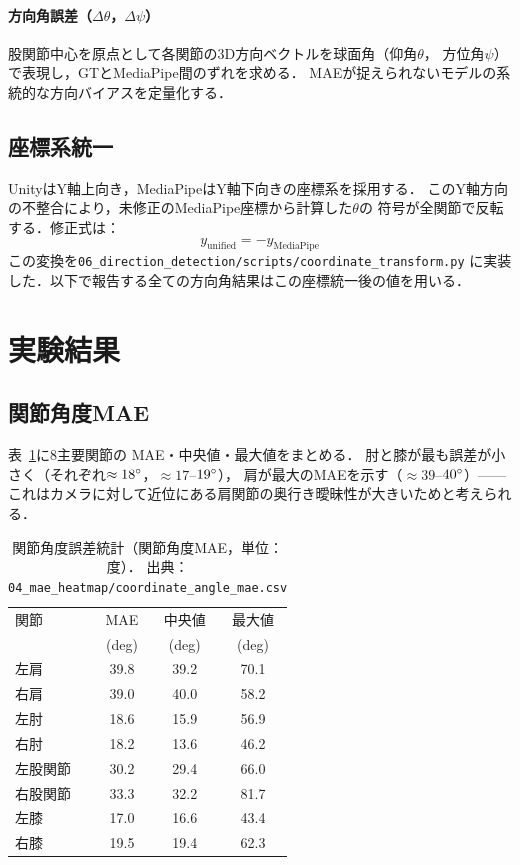 \documentclass[twocolumn]{article}
\begin{document}
\paragraph{方向角誤差（$\Delta\theta$，$\Delta\psi$）}
股関節中心を原点として各関節の3D方向ベクトルを球面角（仰角$\theta$，
方位角$\psi$）で表現し，GTとMediaPipe間のずれを求める．
MAEが捉えられないモデルの系統的な方向バイアスを定量化する．

\subsection{座標系統一}

UnityはY軸上向き，MediaPipeはY軸下向きの座標系を採用する．
このY軸方向の不整合により，未修正のMediaPipe座標から計算した$\theta$の
符号が全関節で反転する．修正式は：
\[
  y_{\text{unified}} = -y_{\text{MediaPipe}}
\]
この変換を\texttt{06\_direction\_detection/scripts/coordinate\_transform.py}
に実装した．以下で報告する全ての方向角結果はこの座標統一後の値を用いる．

\section{実験結果}

\subsection{関節角度MAE}

表~\ref{tab:joint_angle_error}に8主要関節の
MAE・中央値・最大値をまとめる．
肘と膝が最も誤差が小さく（それぞれ$\approx18\degree{}$，$\approx17$--$19\degree{}$），
肩が最大のMAEを示す（$\approx39$--$40\degree{}$）——
これはカメラに対して近位にある肩関節の奥行き曖昧性が大きいためと考えられる．

\begin{table}[!t]
\centering
\caption{関節角度誤差統計（関節角度MAE，単位：度）．
  出典：\texttt{04\_mae\_heatmap/coordinate\_angle\_mae.csv}}
\label{tab:joint_angle_error}
\begin{tabular}{lccc}
\toprule
関節          & MAE    & 中央値 & 最大値  \\
              & (deg)  & (deg)  & (deg)  \\
\midrule
左肩  & 39.8   & 39.2   & 70.1   \\
右肩  & 39.0   & 40.0   & 58.2   \\
左肘  & 18.6   & 15.9   & 56.9   \\
右肘  & 18.2   & 13.6   & 46.2   \\
左股関節  & 30.2   & 29.4   & 66.0   \\
右股関節  & 33.3   & 32.2   & 81.7   \\
左膝  & 17.0   & 16.6   & 43.4   \\
右膝  & 19.5   & 19.4   & 62.3   \\
\bottomrule
\end{tabular}
\end{table}
\end{document}
